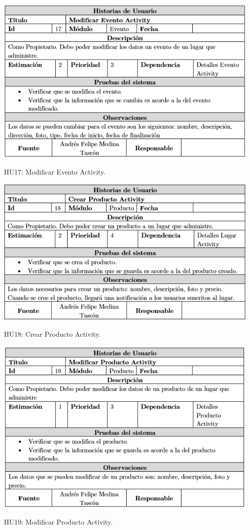 \documentclass[12pt,letterpaper,openany]{book}
\begin{document}
\begin{table}[H]
\centering
\includegraphics[width=13cm]{./imagenes/HU/HU17}
\caption{HU17: Modificar Evento Activity.}
\end{table}

\begin{table}[H]
\centering
\includegraphics[width=13cm]{./imagenes/HU/HU18}
\caption{HU18: Crear Producto Activity.}
\end{table}

\begin{table}[H]
\centering
\includegraphics[width=13cm]{./imagenes/HU/HU19}
\caption{HU19: Modificar Producto Activity.}
\end{table}
\end{document}
